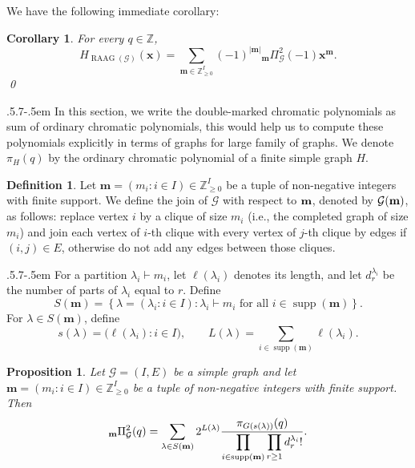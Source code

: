 \documentclass[11pt,reqno]{amsart}
\makeatletter
\numberwithin{equation}{section} %
\newtheorem{prop}{Proposition}
\newtheorem{cor}{Corollary}
\theoremstyle{definition}
\newtheorem{defn}{Definition}
\theoremstyle{remark}
\newcommand{\supp}{\operatorname{supp}}
\newcommand{\RAAG}{\operatorname{RAAG}}
\numberwithin{equation}{section}
\def\subsection{\def\@secnumfont{\bfseries}\@startsection{subsection}{2}%
  {\parindent}{.5\linespacing\@plus.7\linespacing}{-.5em}%
  {\normalfont\bfseries}}
\makeatother
\begin{document}
We have the following immediate corollary:
\begin{cor}
For every \(q\in\mathbb{Z}\),
\[
H_{\RAAG(\mathcal G)}(\mathbf x)
=
\sum_{\mathbf m\in\mathbb{Z}_{\ge0}^{I}}
(-1)^{|\mathbf m|}
{_\mathbf{m}}\Pi_\mathcal G^{2}(-1)
\mathbf x^{\mathbf m}.
\] \qed
\end{cor}

\subsection{} In this section, we write the double-marked chromatic polynomials as sum of ordinary chromatic polynomials, this would help us to compute these polynomials explicitly in terms of graphs for large family of graphs. We denote \(\pi_H(q)\) by the ordinary chromatic polynomial of a finite simple
graph \(H\).

\begin{defn} Let $\mathbf m=(m_i:i\in I)\in\mathbb{Z}_{\ge0}^{I}$ be a tuple of non-negative integers with finite support. We define the join of $\mathcal{G}$ with respect to $\bold{m}$, denoted by $\mathcal{G}(\bold{m})$, as follows: replace
vertex \(i\) by a clique of size \(m_i\) (i.e., the completed graph of size $m_i$) and join each vertex of \(i\)-th clique with every vertex of \(j\)-th clique by edges if
 \((i,j)\in E\), otherwise do  not add any edges between those cliques. \end{defn}

 \subsection{}\label{sect5.3}
For a partition \(\lambda_i\vdash m_i\), let \(\ell(\lambda_i)\) denotes its length, and let
\(d_r^{\lambda_i}\) be the number of parts of \(\lambda_i\) equal to \(r\). Define
\[
S(\mathbf m)
=
\left\{
\lambda=(\lambda_i: i\in I): \lambda_i\vdash m_i \text{ for all } i\in\supp(\mathbf m)
\right\}.
\]
For \(\lambda\in S(\mathbf m)\), define
\[
s(\lambda)=\big(\ell(\lambda_i):i\in I\big),
\qquad
L(\lambda)=\sum_{i\in\supp(\mathbf m)}\ell(\lambda_i).
\]

\begin{prop}
Let \(\mathcal G=(I,E)\) be a simple graph and let $\mathbf m=(m_i:i\in I)\in\mathbb{Z}_{\ge0}^{I}$ be a tuple of non-negative integers with finite support. Then
\[
{_\bold m}\Pi_\mathcal G^{2}(q)
=
\sum_{\lambda\in S(\mathbf m)}
2^{L(\lambda)}
\frac{
\pi_{G(s(\lambda))}(q)
}{
\displaystyle
\prod_{i\in\supp(\mathbf m)}
\prod_{r\ge1} d_r^{\lambda_i}!
}.
\]

\end{prop}
\end{document}
